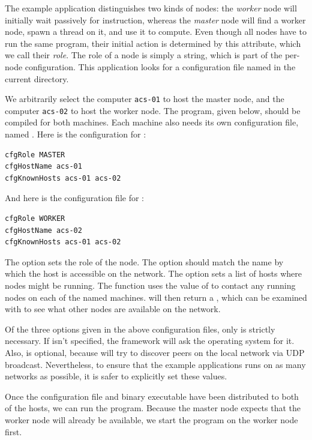 \documentclass[preprint]{sigplanconf}
\begin{document}
The example application distinguishes two kinds of nodes: the {\em worker} node will initially wait passively for instruction, whereas the {\em master} node will find a worker node, spawn a thread on it, and use it to compute. Even though all nodes have to run the same program, their initial action is determined by this attribute, which we call their {\em role}. The role of a node is simply a string, which is part of the per-node configuration. This application looks for a configuration file named  in the current directory.

We arbitrarily select the computer \texttt{acs-01} to host the master node, and the computer \texttt{acs-02} to host the worker node. The program, given below, should be compiled for both machines. Each machine also needs its own configuration file, named . Here is the configuration for :

\begin{lstlisting}
cfgRole MASTER
cfgHostName acs-01
cfgKnownHosts acs-01 acs-02
\end{lstlisting}

\noindent
And here is the configuration file for :

\begin{lstlisting}
cfgRole WORKER
cfgHostName acs-02
cfgKnownHosts acs-01 acs-02
\end{lstlisting}

The  option sets the role of the node. The  option should match the name by which the host is accessible on the network. The  option sets a list of hosts where nodes might be running. The  function uses the value of  to contact any running nodes on each of the named machines.  will then return a , which can be examined with  to see what other nodes are available on the network.

Of the three options given in the above configuration files, only  is strictly necessary. If  isn't specified, the framework will ask the operating system for it. Also,  is optional, because  will try to discover peers on the local network via UDP broadcast. Nevertheless, to ensure that the example applications runs on as many networks as possible, it is safer to explicitly set these values.

Once the configuration file and binary executable have been distributed to both of the hosts, we can run the program. Because the master node expects that the worker node will already be available, we start the program on the worker node first.
\end{document}
